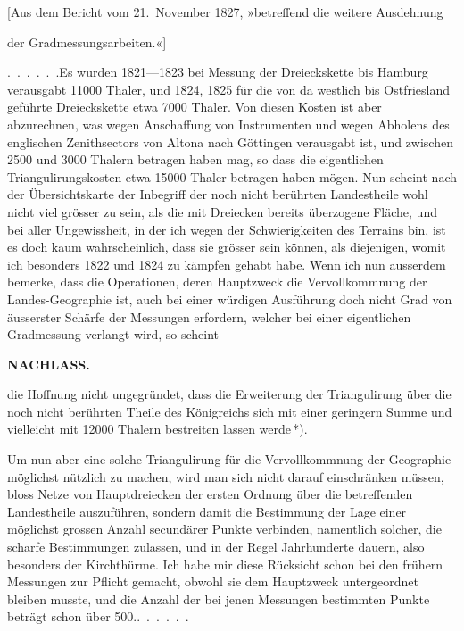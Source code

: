 \bigskip
\begin{center}
[Aus dem Bericht vom 21.~November 1827, »betreffend die weitere Ausdehnung\par
der Gradmessungsarbeiten.«]
\end{center}

\par\noindent\hspace*{\parindent}\mbox{.\ .\ .\ .\ .\ .}\quad Es wurden 1821---1823 bei Messung der Dreieckskette bis Hamburg
verausgabt 11000 Thaler, und 1824, 1825 für die von da westlich bis Ostfriesland
geführte Dreieckskette etwa 7000 Thaler. Von diesen Kosten ist aber
abzurechnen, was wegen Anschaffung von Instrumenten und wegen Abholens
des englischen Zenithsectors von Altona nach Göttingen verausgabt ist, und
zwischen 2500 und 3000 Thalern betragen haben mag, so dass die eigentlichen
Triangulirungskosten etwa 15000 Thaler betragen haben mögen. Nun scheint
nach der Übersichtskarte der Inbegriff der noch nicht berührten Landestheile
wohl nicht viel grösser zu sein, als die mit Dreiecken bereits überzogene
Fläche, und bei aller Ungewissheit, in der ich wegen der Schwierigkeiten des
Terrains bin, ist es doch kaum wahrscheinlich, dass sie grösser sein können,
als diejenigen, womit ich besonders 1822 und 1824 zu kämpfen gehabt habe.
Wenn ich nun ausserdem bemerke, dass die Operationen, deren Hauptzweck
die Vervollkommnung der Landes-Geographie ist, auch bei einer würdigen
Ausführung doch nicht  Grad von äusserster Schärfe der Messungen erfordern,
welcher bei einer eigentlichen Gradmessung verlangt wird, so scheint
\par\clearpage
\noindent{}\hfill{\small\textbf{NACHLASS.}}\hfill\null\par\medskip
\noindent die Hoffnung nicht ungegründet, dass die Erweiterung der Triangulirung über
die noch nicht berührten Theile des Königreichs sich mit einer geringern
Summe und vielleicht mit 12000 Thalern bestreiten lassen werde\,*).

Um nun aber eine solche Triangulirung für die Vervollkommnung der
Geographie möglichst nützlich zu machen, wird man sich nicht darauf einschränken
müssen, bloss Netze von Hauptdreiecken der ersten Ordnung über
die betreffenden Landestheile auszuführen, sondern damit die Bestimmung der
Lage einer möglichst grossen Anzahl secundärer Punkte verbinden, namentlich
solcher, die scharfe Bestimmungen zulassen, und in der Regel Jahrhunderte
dauern, also besonders der Kirchthürme. Ich habe mir diese Rücksicht
schon bei den frühern Messungen zur Pflicht gemacht, obwohl sie dem Hauptzweck
untergeordnet bleiben musste, und die Anzahl der bei jenen Messungen
bestimmten Punkte beträgt schon über 500.\quad\mbox{.\ .\ .\ .\ .\ .}


